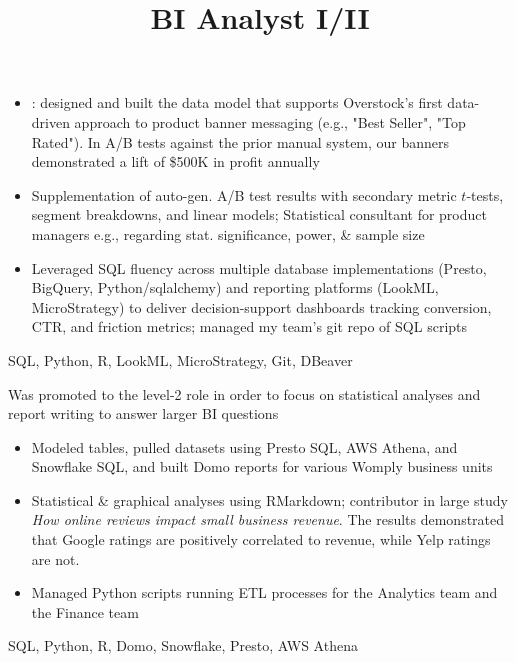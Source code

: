 \documentclass[resmargin, centered, 10pt]{res}
\begin{document}
\begin{resume}
\begin{position}
	\begin{itemize}
		\item {}: designed and built the data model that supports Overstock's first data-driven approach to product banner messaging (e.g., "Best Seller", "Top Rated"). In A/B tests against the prior manual system, our banners demonstrated a lift of \$500K in profit annually
		\item {} Supplementation of auto-gen. A/B test results with secondary metric $t$-tests, segment breakdowns, and linear models; Statistical consultant for product managers e.g., regarding stat. significance, power, \& sample size
		\item {} Leveraged SQL fluency across multiple database implementations (Presto, BigQuery, Python/sqlalchemy) and reporting platforms (LookML, MicroStrategy) to deliver decision-support dashboards tracking conversion, CTR, and friction metrics; managed my team's git repo of SQL scripts
	\end{itemize}

	 SQL, Python, R, LookML, MicroStrategy, Git, DBeaver
\end{position}

\title{BI Analyst I/II}
\begin{position}
	Was promoted to the level-2 role in order to focus on statistical analyses and report writing to answer larger BI questions

	\begin{itemize}
		\item {} Modeled tables, pulled datasets using Presto SQL, AWS Athena, and Snowflake SQL, and built Domo reports for various Womply business units
		\item {} Statistical  \& graphical analyses using RMarkdown; contributor in large study \textit{How online reviews impact small business revenue}. The results demonstrated that Google ratings are positively correlated to revenue, while Yelp ratings are not.
		\item {} Managed Python scripts running ETL processes for the Analytics team and the Finance team
	\end{itemize}

	 SQL, Python, R, Domo, Snowflake, Presto, AWS Athena
\end{position}


\end{resume}
\end{document}
